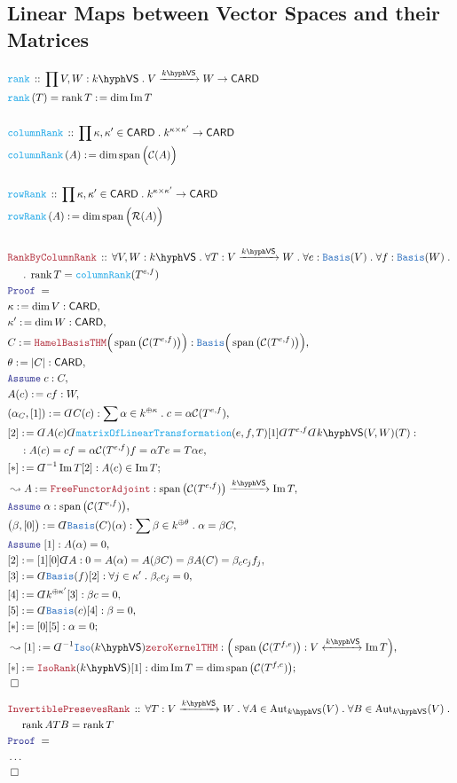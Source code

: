 \documentclass[12pt]{scrartcl}%
\newcommand{\TYPE}[1]{\textcolor{NavyBlue}{\mathtt{#1}}}%
\newcommand{\FUNC}[1]{\textcolor{Cerulean}{\mathtt{#1}}}%
\newcommand{\LOGIC}[1]{\textcolor{Blue}{\mathtt{#1}}}%
\newcommand{\THM}[1]{\textcolor{Maroon}{\mathtt{#1}}}%
\renewcommand{\.}{\; . \;} %
\newcommand{\de}{: \kern 0.1pc =} %
\newcommand{\Act}[1]{\left( #1 \right)} %
\newcommand{\Theorem}[2]{& \THM{#1} \, :: \, #2 \\ & \Proof = \\ } %
\newcommand{\DeclareFunc}[2]{& \FUNC{#1} \, :: \, #2 \\}%
\newcommand{\DefineFunc}[3]{&  \FUNC{#1}\Act{#2} \de #3 \\}%
\newcommand{\DefineNamedFunc}[4]{&  \FUNC{#1}\Act{#2} = #3 \de #4 \\}%
\newcommand{\NewLine}{\\ & \kern 1pc}%
\newcommand{\Page}[1]{ \begin{align*} #1 \end{align*}  }%
\newcommand{ \bd }{ \ByDef }%
\newcommand{\NoProof}{ & \ldots \\ \EndProof}%
\DeclareMathOperator*{\im}{Im}%
\newcommand{\Aut}{\mathrm{Aut}}%
\newcommand{\Say}[3]{& #1 \de #2 : #3, \\} %
\newcommand{\Conclude}[3]{& #1 \de #2 : #3; \\}%
\newcommand{\Derive}[3]{& \leadsto #1 \de #2 : #3, \\} %
\newcommand{\Assume}[2]{& \LOGIC{Assume} \; #1 : #2, \\} %
\newcommand{\QED}{\; \square} %
\newcommand{\EndProof}{& \QED \\} %
\newcommand{\ByDef}{\rotatebox[origin=c]{-180}{$D$}}%
\newcommand{\Proof}{\LOGIC{Proof} \; } %
\newcommand{\Arrow}[1]{\xrightarrow{#1}}%
\newcommand{\ToIso}[1]{\xleftrightarrow{#1}}%
\newcommand{\C}{\mathcal{C}}
\newcommand{\R}{\mathcal{R}}
\DeclareMathOperator{\rank}{rank} %
\newcommand{\Basis}{\TYPE{Basis}} %
\DeclareMathOperator{\Span}{span} %
\newcommand{\VS}[1]{#1\hyph\mathsf{VS}} %
\begin{document}
\subsection{Linear Maps between Vector Spaces and their Matrices}
\Page{
	\DeclareFunc{rank}{\prod V,W : \VS{k} \. V \Arrow{\VS{k}} W \to \mathsf{CARD}}
	\DefineNamedFunc{rank}{T}{\rank T}{\dim \im T}
	\\
	\DeclareFunc{columnRank}{\prod \kappa,\kappa' \in \mathsf{CARD} \. k^{\kappa \times \kappa'} \to \mathsf{CARD}}
	\DefineFunc{columnRank}{A}{\dim \Span\Big(\C(A)\Big)}
	\\
	\DeclareFunc{rowRank}{\prod \kappa,\kappa' \in \mathsf{CARD} \. k^{\kappa \times \kappa'} \to \mathsf{CARD}}
	\DefineFunc{rowRank}{A}{\dim \Span\Big(\R(A)\Big)}
	\\
	\Theorem{RankByColumnRank}{\forall V,W : \VS{k} \. \forall T : V \Arrow{\VS{k}} W \. 
		\forall e : \Basis(V) \. \forall f : \Basis(W) \. \NewLine \. \rank T = \FUNC{columnRank}{(T^{e,f})}}
	\Say{\kappa}{\dim V}{\mathsf{CARD}}
	\Say{\kappa'}{\dim W}{\mathsf{CARD}}
	\Say{C}{\THM{HamelBasisTHM}\Big(\Span\big(\C(T^{e,f})\big)\Big)}{\Basis\Big(\Span\big(\C(T^{e,f} )\big)\Big)}
	\Say{\theta}{|C|}{\mathsf{CARD}}
	\Assume{c}{C}
	\Say{A(c)}{cf}{W}
	\Say{(\alpha_C,[1])}{\bd C(c)}{\sum \alpha \in k^{\oplus\kappa} \. c = \alpha \C(T^{e,f})} 
	\Say{[2]}{\bd A(c) \bd \FUNC{matrixOfLinearTransformation}(e,f,T)[1] \bd T^{e,f} \bd \VS{k}(V,W)(T)}
	{ \NewLine :  A(c) = cf = \alpha \C(T^{e,f}) f  = \alpha T  e = T \alpha e }
	\Conclude{[*]}{ \bd^{-1} \im T [2]}{ A(c) \in \im T }
	\Derive{A}{\THM{FreeFunctorAdjoint}}{\Span\big(\C(T^{e,f})\big) \Arrow{\VS{k}} \im T}
	\Assume{\alpha}{\Span\big(\C(T^{e,f})\big)}
	\Say{\big(\beta,[0]\big)}{\bd \TYPE{Basis}(C)(\alpha)}{\sum \beta \in k^{\oplus \theta} \. \alpha = \beta C }
	\Assume{[1]}{A(\alpha) = 0}
	\Say{[2]}{[1][0]\bd A}{0 = A(\alpha) = A(\beta C) = \beta A(C) = \beta_c c_j f_j }
	\Say{[3]}{\bd \Basis(f)[2]}{ \forall j \in \kappa' \.  \beta_c c_j = 0   }
	\Say{[4]}{ \bd k^{\oplus \kappa'}[3] }{\beta c = 0}
	\Say{[5]}{\bd \TYPE{Basis}(c)[4]}{\beta = 0}
	\Conclude{[*]}{[0][5]}{\alpha = 0}
	\Derive{[1]}{\bd^{-1}\TYPE{Iso}(\VS{k})\THM{zeroKernelTHM}}{\Big( \Span\big(\C(T^{f,e})\big) : V \ToIso{\VS{k}} \im T  \Big)  }
	\Conclude{[*]}{\THM{IsoRank}(\VS{k})[1]}{ \dim \im T = \dim \Span\big(\C(T^{f,e}) \big) }
	\EndProof
}\Page{
	\Theorem{InvertiblePresevesRank}{\forall T : V\Arrow{\VS{k}}W \. \forall A \in \Aut_{\VS{k}}(V) \. \forall B \in \Aut_{\VS{k}}(V) \. 
		\NewLine \rank ATB = \rank T  }
	\NoProof
	\\
}
\end{document}
